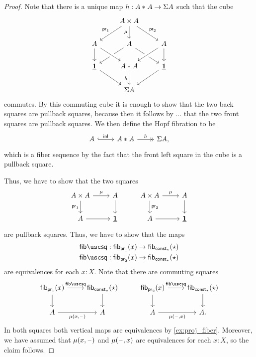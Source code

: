 \begin{proof}
  Note that there is a unique map $h:{A}\ast_{}{A}\to \Sigma A$ such that the cube
  \begin{equation*}
    \begin{tikzcd}
      & A \times A \arrow[d,swap,"\mu"] \arrow[dl,swap,"\proj 1"] \arrow[dr,"\proj 2"] \\
      A \arrow[d] & A \arrow[dl] \arrow[dr] & A \arrow[dl,crossing over] \arrow[d] \\
      \unit \arrow[dr] & \join{A}{A} \arrow[from=ul,crossing over] \arrow[d,swap,densely dotted,"h"] & \unit \arrow[dl] \\
      & \susp A
    \end{tikzcd}
  \end{equation*}
  commutes. By this commuting cube it is enough to show that the two back squares are pullback squares, because then it follows by ... that the two front squares are pullback squares. We then define the Hopf fibration to be
  \begin{equation*}
    \begin{tikzcd}
      A \arrow[r,hook,"\inl"] & \join{A}{A} \arrow[r,->>,"h"] & \susp A,
    \end{tikzcd}
  \end{equation*}
  which is a fiber sequence by the fact that the front left square in the cube is a pullback square.

  Thus, we have to show that the two squares
    \begin{equation*}
    \begin{tikzcd}
      A\times A \arrow[d,swap,"\proj 1"] \arrow[r,"\mu"] & A \arrow[d] & A\times A \arrow[r,"\mu"] \arrow[d,"\proj 2"] & A \arrow[d] \\
      A \arrow[r] & \unit & A \arrow[r] & \unit
    \end{tikzcd}
  \end{equation*}
  are pullback squares. Thus, we have to show that the maps
  \begin{align*}
    \fibsquare & : \fib{\proj 1}{x}\to\fib{\const_{\star}}{\star} \\
    \fibsquare & : \fib{\proj 2}{x}\to\fib{\const_{\star}}{\star}
  \end{align*}
  are equivalences for each $x:X$. Note that there are commuting squares
  \begin{equation*}
    \begin{tikzcd}
      \fib{\proj 1}{x} \arrow[r,"\fibsquare"] \arrow[d] & \fib{\const_{\star}}{\star} \arrow[d] & \fib{\proj 2}{x} \arrow[r,"\fibsquare"] \arrow[d] & \fib{\const_{\star}}{\star} \arrow[d] \\
      A \arrow[r,swap,"{\mu(x,\blank)}"] & A & A \arrow[r,swap,"{\mu(\blank,x)}"] & A.
    \end{tikzcd}
  \end{equation*}
  In both squares both vertical maps are equivalences by \cref{ex:proj_fiber}. Moreover, we have assumed that $\mu(x,\mathord{\hspace{1pt}\text{--}\hspace{1pt}})$ and $\mu(\mathord{\hspace{1pt}\text{--}\hspace{1pt}},x)$ are equivalences for each $x:X$, so the claim follows.
\end{proof}

